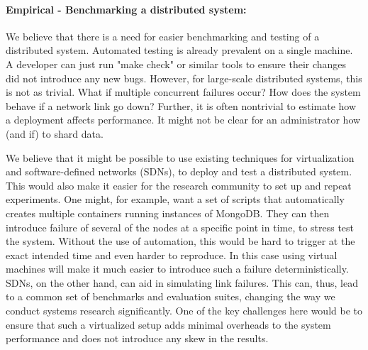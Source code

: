 \paragraph{Empirical - Benchmarking a distributed system:} We believe that there is a need for easier benchmarking and testing of a distributed system. Automated testing is already prevalent on a single machine. A developer can just run "make check" or similar tools to ensure their changes did not introduce any new bugs. However, for large-scale distributed systems, this is not as trivial. What if multiple concurrent failures occur? How does the system behave if a network link go down?
Further, it is often nontrivial to estimate how a deployment affects performance. It might not be clear for an administrator how (and if) to shard data.

We believe that it might be possible to use existing techniques for virtualization and software-defined networks (SDNs), to deploy and test a distributed system. This would also make it easier for the research community to set up and repeat experiments.
One might, for example, want a set of scripts that automatically creates multiple containers running instances of MongoDB. They can then introduce failure of several of the nodes at a specific point in time, to stress test the system. Without the use of automation, this would be hard to trigger at the exact intended time and even harder to reproduce. In this case using virtual machines will make it much easier to introduce such a failure deterministically. SDNs, on the other hand, can aid in simulating link failures. This can, thus, lead to a common set of benchmarks and evaluation suites, changing the way we conduct systems research significantly. One of the key challenges here would be to ensure that such a virtualized setup adds minimal overheads to the system performance and does not introduce any skew in the results.
